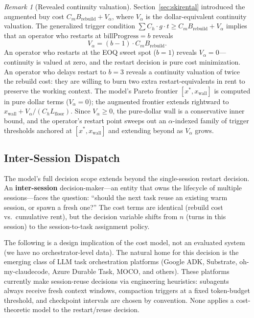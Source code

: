 \documentclass[11pt]{article}
\theoremstyle{definition}
\theoremstyle{remark}
\newtheorem{remark}[theorem]{Remark}
\begin{document}
\begin{remark}[Revealed continuity valuation]
\label{rem:revealedalpha}
Section~\ref{sec:skirental} introduced the augmented buy cost $C_m B_{\text{rebuild}} + V_\alpha$, where $V_\alpha$ is the dollar-equivalent continuity valuation. The generalized trigger condition $\sum C_h \cdot g \cdot t \ge C_m B_{\text{rebuild}} + V_\alpha$ implies that an operator who restarts at $\text{billProgress} = b$ reveals
\[
V_\alpha = (b - 1) \cdot C_m B_{\text{rebuild}}.
\]
An operator who restarts at the EOQ sweet spot ($b = 1$) reveals $V_\alpha = 0$---continuity is valued at zero, and the restart decision is pure cost minimization. An operator who delays restart to $b = 3$ reveals a continuity valuation of twice the rebuild cost: they are willing to burn two extra restart-equivalents in rent to preserve the working context. The model's Pareto frontier $[x^*, x_{\text{wall}}]$ is computed in pure dollar terms ($V_\alpha = 0$); the augmented frontier extends rightward to $x_{\text{wall}} + V_\alpha/(C_h L_{\text{floor}})$. Since $V_\alpha \ge 0$, the pure-dollar wall is a conservative inner bound, and the operator's restart point sweeps out an $\alpha$-indexed family of trigger thresholds anchored at $[x^*, x_{\text{wall}}]$ and extending beyond as $V_\alpha$ grows.
\end{remark}

\subsection{Inter-Session Dispatch}

The model's full decision scope extends beyond the single-session restart decision. An \textbf{inter-session} decision-maker---an entity that owns the lifecycle of multiple sessions---faces the question: ``should the next task reuse an existing warm session, or spawn a fresh one?'' The cost terms are identical (rebuild cost vs.\ cumulative rent), but the decision variable shifts from $n$ (turns in this session) to the session-to-task assignment policy.

The following is a design implication of the cost model, not an evaluated system (we have no orchestrator-level data). The natural home for this decision is the emerging class of LLM task orchestration platforms (Google ADK, Substrate, oh-my-claudecode, Azure Durable Task, MOCO, and others). These platforms currently make session-reuse decisions via engineering heuristics: subagents always receive fresh context windows, compaction triggers at a fixed token-budget threshold, and checkpoint intervals are chosen by convention. None applies a cost-theoretic model to the restart/reuse decision.
\end{document}
